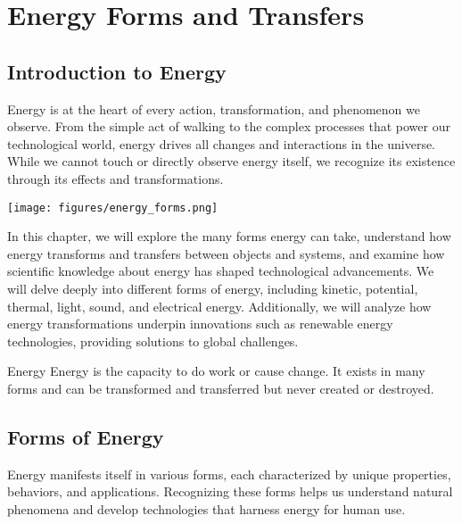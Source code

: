 \chapter{Energy Forms and Transfers}

\section{Introduction to Energy}

Energy is at the heart of every action, transformation, and phenomenon we observe. From the simple act of walking to the complex processes that power our technological world, energy drives all changes and interactions in the universe. While we cannot touch or directly observe energy itself, we recognize its existence through its effects and transformations.

\begin{marginfigure}
\centering
\texttt{[image: figures/energy\_forms.png]}
\caption{Illustration of various forms of energy}
\end{marginfigure}

In this chapter, we will explore the many forms energy can take, understand how energy transforms and transfers between objects and systems, and examine how scientific knowledge about energy has shaped technological advancements. We will delve deeply into different forms of energy, including kinetic, potential, thermal, light, sound, and electrical energy. Additionally, we will analyze how energy transformations underpin innovations such as renewable energy technologies, providing solutions to global challenges.

\begin{keyconcept}{Energy}
Energy is the capacity to do work or cause change. It exists in many forms and can be transformed and transferred but never created or destroyed.
\end{keyconcept}

\section{Forms of Energy}

Energy manifests itself in various forms, each characterized by unique properties, behaviors, and applications. Recognizing these forms helps us understand natural phenomena and develop technologies that harness energy for human use.

